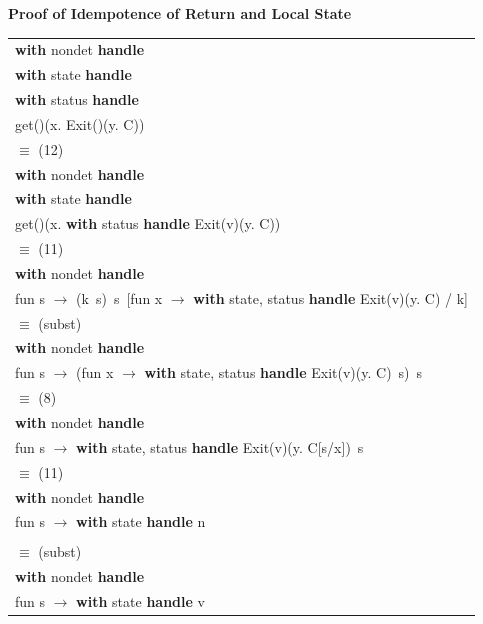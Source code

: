 \documentclass[logo,bsc,singlespacing,parskip]{infthesis}
\begin{document}
\vspace{1em}
{\large{\textbf{Proof of Idempotence of Return and Local State}}}

\normalsize



\begin{longtable}{@{}l@{}}
\textbf{with } nondet \textbf{ handle} \\
\quad \textbf{with } state \textbf{ handle} \\
\quad\quad \textbf{with } status \textbf{ handle} \\
\quad\quad\quad get()(x. Exit()(y. C)) \\

\quad$\equiv$ (12) \\
\textbf{with } nondet \textbf{ handle} \\
\quad \textbf{with } state \textbf{ handle} \\
\quad\quad get()(x. \textbf{with } status \textbf{ handle } Exit(v)(y. C)) \\

\quad$\equiv$ (11) \\
\textbf{with } nondet \textbf{ handle} \\
\quad fun s $\rightarrow$ (k\ s)\ s\ [fun x $\rightarrow$ \textbf{with } state, status \textbf{ handle } Exit(v)(y. C) / k] \\

\quad$\equiv$ (subst) \\
\textbf{with } nondet \textbf{ handle} \\
\quad fun s $\rightarrow$ (fun x $\rightarrow$ \textbf{with } state, status \textbf{ handle } Exit(v)(y. C)\ s)\ s \\

\quad$\equiv$ (8) \\
\textbf{with } nondet \textbf{ handle} \\
\quad fun s $\rightarrow$ \textbf{with } state, status \textbf{ handle } Exit(v)(y. C[s/x])\ s \\

\quad$\equiv$ (11) \\
\textbf{with } nondet \textbf{ handle} \\
\quad fun s $\rightarrow$ \textbf{with } state \textbf{ handle } n \\
\quad{} 
\\ \quad$\equiv$ (subst) \\
\textbf{with } nondet \textbf{ handle} \\
\quad fun s $\rightarrow$ \textbf{with } state \textbf{ handle } v \\
\end{longtable}
\end{document}
